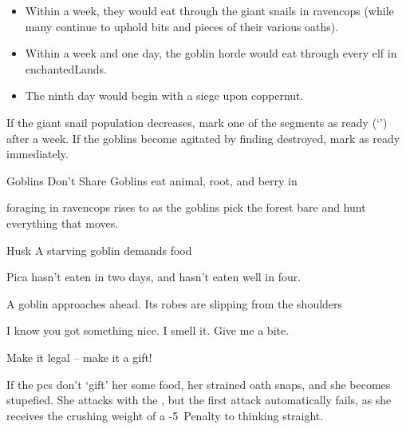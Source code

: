 \begin{multicols}{2}
\index{\expandafter\Glsfmtname{MindElder}'s Death}

\begin{itemize}
  \item
  Within a week, they would eat through the giant snails in \gls{ravencops} (while many continue to uphold bits and pieces of their various oaths).
  \item
  Within a week and one day, the goblin horde would eat through every elf in \gls{enchantedLands}.
  \item
  The ninth day would begin with a siege upon \gls{coppernut}.
\end{itemize}

\vspace{-3em}
\label{goblinsRise}

\renewcommand\enchantedRations{empty bowl}

If the giant snail population decreases, mark one of the \glspl{segment} as ready (`\sgr') after a week.
If the goblins become agitated by finding  destroyed, mark  as ready immediately.

\setcounter{segNo}{-1}
{Goblins Don't Share}%
{Goblins eat animal, root, and berry in }%

\Gls{foraging} in \gls{ravencops} rises to \tn[16] as the goblins pick the forest bare and hunt everything that moves.

{Husk}%
{A starving goblin demands food}%

Pica hasn't eaten in two days, and hasn't eaten well in four.

\begin{boxtext}
  A goblin approaches ahead.
  Its robes are slipping from the shoulders
\end{boxtext}

\begin{speechtext}
  I know you got something nice.
  I smell it.
  Give me a bite.

  Make it legal -- make it a gift!
\end{speechtext}

If the \glspl{pc} don't `gift' her some food, her strained oath snaps, and she becomes stupefied.
She attacks with the \weaponName, but the first attack automatically fails, as she receives the crushing weight of a -5~Penalty to thinking straight.


\end{multicols}
